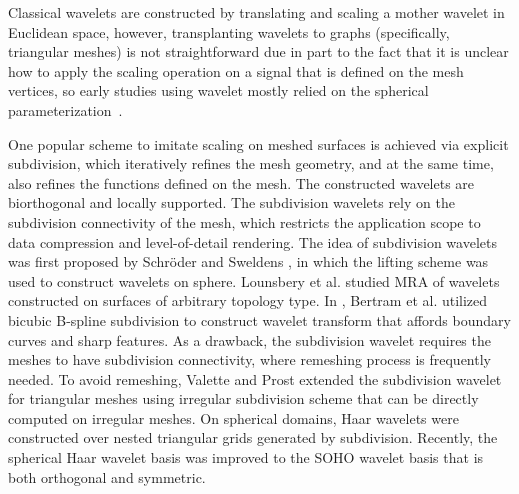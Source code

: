 Classical wavelets are constructed by translating and scaling a mother wavelet in Euclidean
space, however, transplanting wavelets to graphs (specifically, triangular meshes) is not
straightforward due in part to the fact that it is unclear how to apply the scaling operation
on a signal that is defined on the mesh vertices, so early studies using wavelet mostly
relied on the spherical parameterization~\cite{Werghi:2002,Liu:2007}.

One popular scheme to imitate scaling on meshed surfaces is achieved via explicit subdivision,
which iteratively refines the mesh geometry, and at the same time, also refines the functions
defined on the mesh. The constructed wavelets are biorthogonal and locally supported.
The subdivision wavelets rely on the subdivision connectivity of the mesh, which restricts the
application scope to data compression and level-of-detail rendering. The idea of subdivision
wavelets was first proposed by Schr\"{o}der and Sweldens \cite{Schroder:1995:SIGGRAPH}, in
which the lifting scheme was used to construct wavelets on sphere.
Lounsbery et al. \cite{Lounsbery:1997:TOG} studied MRA of wavelets constructed on surfaces
of arbitrary topology type. In \cite{Bertram:2000:vis}, Bertram et al. utilized bicubic
B-spline subdivision to construct wavelet transform that affords boundary curves and sharp
features. As a drawback, the subdivision wavelet
requires the meshes to have subdivision connectivity, where remeshing process is frequently
needed. To avoid remeshing, Valette and Prost \cite{Valette:2004:TVCG} extended the subdivision
wavelet for triangular meshes using irregular subdivision scheme that can be directly computed
on irregular meshes. On spherical domains, Haar wavelets \cite{Nielson:1997:vis,Bonneau:1999:vis}
were constructed over nested triangular grids generated by subdivision. Recently, the spherical
Haar wavelet basis was improved to the SOHO wavelet basis \cite{Lessig:2008:TOG} that is both
orthogonal and symmetric.

